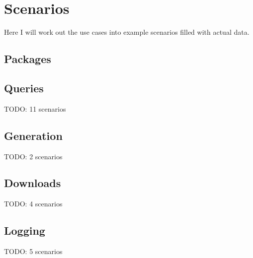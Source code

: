 \newpage
\section{Scenarios}  
Here I will work out the use cases into example scenarios filled with actual
data.


\subsection{Packages}









\subsection{Queries}
TODO: 11 scenarios

%
%
%
%
%
%
%
%
%
%
%


\subsection{Generation}
TODO: 2 scenarios
%
%


\subsection{Downloads}
TODO: 4 scenarios
%
%
%
%


\subsection{Logging}
TODO: 5 scenarios
%
%
%
%
%


